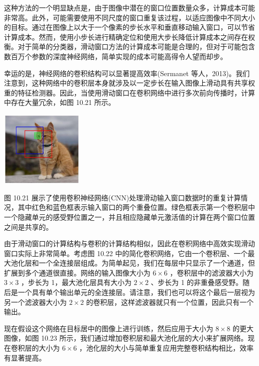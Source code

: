 \documentclass[10pt]{report}
\begin{document}
这种方法的一个明显缺点是，由于图像中潜在的窗口位置数量众多，计算成本可能非常高。此外，可能需要使用不同尺度的窗口重复该过程，以适应图像中不同大小的目标。通过在图像上以大于一个像素的步长水平和垂直移动输入窗口，可以节省计算成本。然而，使用小步长进行精确定位和使用大步长降低计算成本之间存在权衡。对于简单的分类器，滑动窗口方法的计算成本可能是合理的，但对于可能包含数百万个参数的深度神经网络，简单实现的成本可能高得令人望而却步。

幸运的是，神经网络的卷积结构可以显著提高效率(Sermanet 等人，2013)。我们注意到，这种网络中的卷积层本身就涉及以一定步长在输入图像上滑动具有共享权重的特征检测器。因此，当使用滑动窗口在卷积网络中进行多次前向传播时，计算中存在大量冗余，如图 10.21 所示。

\begin{center}
\includegraphics[max width=0.3\textwidth]{images/0194e279-9b28-703a-88f4-c3ac21e2010d_331_999_349_479_441_0.jpg}
\end{center}
\hspace*{3em} 

图 10.21 展示了使用卷积神经网络(CNN)处理滑动输入窗口数据时的重复计算情况，其中红色和蓝色框表示输入窗口的两个重叠位置。绿色框表示第一个卷积层中一个隐藏单元的感受野位置之一，并且相应隐藏单元激活值的计算在两个窗口位置之间是共享的。

由于滑动窗口的计算结构与卷积的计算结构相似，因此在卷积网络中高效实现滑动窗口实际上非常简单。考虑图 10.22 中的简化卷积网络，它由一个卷积层、一个最大池化层和一个全连接层组成。为简单起见，我们在每层中只显示了一个通道，但扩展到多个通道很直接。网络的输入图像大小为 \(6 \times  6\) ，卷积层中的滤波器大小为 \(3 \times  3\) ，步长为 1，最大池化层具有大小为 \(2 \times  2\) 、步长为 1 的非重叠感受野。随后是一个具有单个输出单元的全连接层。请注意，我们也可以将这个最后一层视为另一个滤波器大小为 \(2 \times  2\) 的卷积层，这样滤波器就只有一个位置，因此只有一个输出。

现在假设这个网络在目标居中的图像上进行训练，然后应用于大小为 \(8 \times  8\) 的更大图像，如图 10.23 所示，我们通过增加卷积层和最大池化层的大小来扩展网络。现在卷积层的大小为 \(6 \times  6\) ，池化层的大小与简单重复应用完整卷积结构相比，效率有显著提高。
\end{document}

